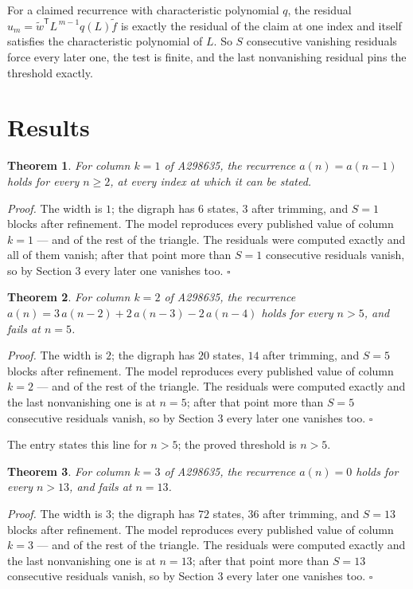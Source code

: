 \documentclass[11pt]{article}
\newtheorem{theorem}{Theorem}
\theoremstyle{definition}
\begin{document}
For a claimed recurrence with characteristic polynomial $q$, the residual $u_m = \tilde w^{\mathsf T}L^{\,m-1}q(L)\tilde f$ is exactly the residual of the claim at one index and itself satisfies the characteristic polynomial of $L$. So $S$ consecutive vanishing residuals force every later one, the test is finite, and the last nonvanishing residual pins the threshold exactly.

\section{Results}

\begin{theorem} For column $k = 1$ of A298635, the recurrence $a(n) = a(n-1)$ holds for every $n \ge 2$, at every index at which it can be stated.\end{theorem}

{\itshape Proof.} The width is $1$; the digraph has $6$ states, $3$ after trimming, and $S = 1$ blocks after refinement. The model reproduces every published value of column $k = 1$ --- and of the rest of the triangle. The residuals were computed exactly and all of them vanish; after that point more than $S = 1$ consecutive residuals vanish, so by Section 3 every later one vanishes too. $\square$

\begin{theorem} For column $k = 2$ of A298635, the recurrence $a(n) = 3\,a(n-2) + 2\,a(n-3) - 2\,a(n-4)$ holds for every $n > 5$, and fails at $n = 5$.\end{theorem}

{\itshape Proof.} The width is $2$; the digraph has $20$ states, $14$ after trimming, and $S = 5$ blocks after refinement. The model reproduces every published value of column $k = 2$ --- and of the rest of the triangle. The residuals were computed exactly and the last nonvanishing one is at $n = 5$; after that point more than $S = 5$ consecutive residuals vanish, so by Section 3 every later one vanishes too. $\square$

The entry states this line for $n > 5$; the proved threshold is $n > 5$.

\begin{theorem} For column $k = 3$ of A298635, the recurrence $a(n) = 0$ holds for every $n > 13$, and fails at $n = 13$.\end{theorem}

{\itshape Proof.} The width is $3$; the digraph has $72$ states, $36$ after trimming, and $S = 13$ blocks after refinement. The model reproduces every published value of column $k = 3$ --- and of the rest of the triangle. The residuals were computed exactly and the last nonvanishing one is at $n = 13$; after that point more than $S = 13$ consecutive residuals vanish, so by Section 3 every later one vanishes too. $\square$
\end{document}
